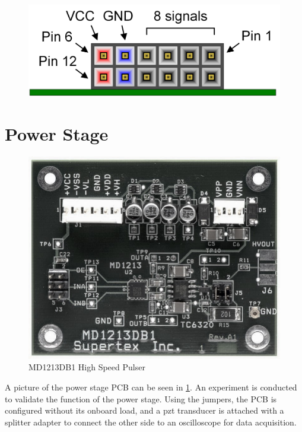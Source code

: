 \begin{figure}[htbp]
	\centering
	\includegraphics[width=.8\textwidth]{Figures/4_pynq-z1-pmod.png}
\end{figure}

\section{Power Stage}
\begin{figure}[htbp]
	\centering
	\includegraphics[width=.8\textwidth]{Figures/4_transmitter_pcb_pic.jpg}
	\caption{MD1213DB1 High Speed Pulser}
	\label{fig:4_transmitter_pcb_pic}
\end{figure}
A picture of the power stage PCB can be seen in \cref{fig:4_transmitter_pcb_pic}. An experiment is conducted to validate the function of the power stage. Using the jumpers, the PCB is configured without its onboard load, and a \gls{pzt} transducer is attached with a splitter adapter to connect the other side to an oscilloscope for data acquisition.

